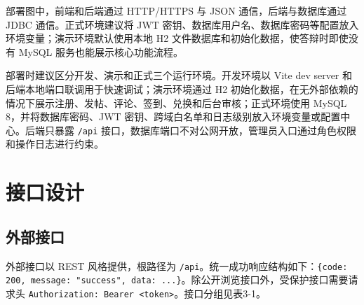 \documentclass[UTF8,zihao=-4,a4paper]{ctexart}
\begin{document}
部署图中，前端和后端通过 HTTP/HTTPS 与 JSON 通信，后端与数据库通过 JDBC 通信。正式环境建议将 JWT 密钥、数据库用户名、数据库密码等配置放入环境变量；演示环境默认使用本地 H2 文件数据库和初始化数据，使答辩时即使没有 MySQL 服务也能展示核心功能流程。

部署时建议区分开发、演示和正式三个运行环境。开发环境以 Vite dev server 和后端本地端口联调用于快速调试；演示环境通过 H2 初始化数据，在无外部依赖的情况下展示注册、发帖、评论、签到、兑换和后台审核；正式环境使用 MySQL 8，并将数据库密码、JWT 密钥、跨域白名单和日志级别放入环境变量或配置中心。后端只暴露 \texttt{/api} 接口，数据库端口不对公网开放，管理员入口通过角色权限和操作日志进行约束。

\section{接口设计}

\subsection{外部接口}

外部接口以 REST 风格提供，根路径为 \texttt{/api}。统一成功响应结构如下：\texttt{\{code: 200, message: "success", data: ...\}}。除公开浏览接口外，受保护接口需要请求头 \texttt{Authorization: Bearer <token>}。接口分组见表3-1。
\end{document}
